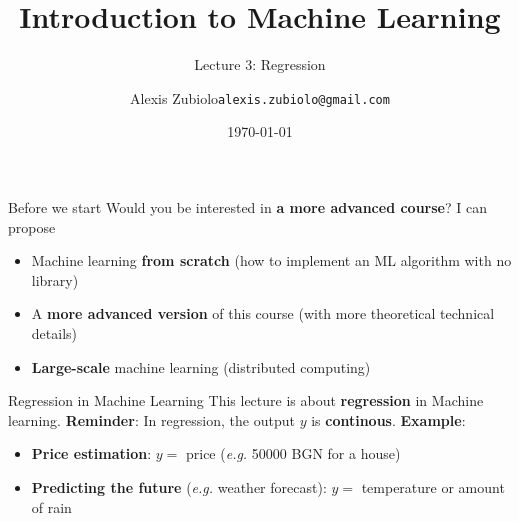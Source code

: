 \documentclass{beamer}
\title[Classification]{Introduction to Machine Learning}
\subtitle{Lecture 3: Regression}
\author{Alexis Zubiolo\newline\texttt{alexis.zubiolo@gmail.com}}
\institute{Data Science Team Lead @ Adcash}
\date{\today}
\begin{document}
\begin{frame}
  \titlepage
\end{frame}

\begin{frame}{Before we start}
Would you be interested in \textbf{a more advanced course}? I can propose 
\begin{itemize}
	\item Machine learning \textbf{from scratch} (how to implement an ML algorithm with no library)
	\item A \textbf{more advanced version} of this course (with more theoretical technical details)
	\item \textbf{Large-scale} machine learning (distributed computing)
\end{itemize}
\end{frame}

\begin{frame}{Regression in Machine Learning}
This lecture is about \textbf{regression} in Machine learning.
\vfill
\textbf{Reminder}: In regression, the output $y$ is \textbf{continous}.
\vfill
\textbf{Example}:
\begin{itemize}
	\item \textbf{Price estimation}: $y =$ price (\textit{e.g.} 50000 BGN for a house)
	\item \textbf{Predicting the future} (\textit{e.g.} weather forecast): $y =$ temperature or amount of rain 
\end{itemize}
\end{frame}
\end{document}

